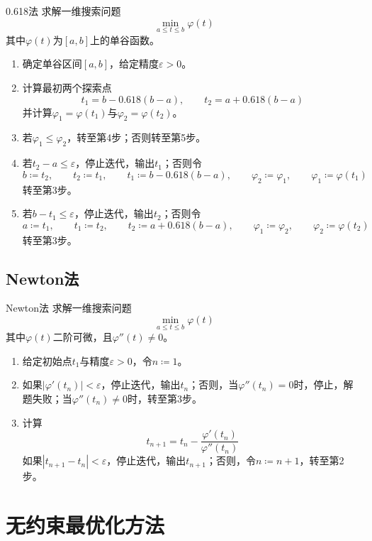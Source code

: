 \documentclass[lang = cn, scheme = chinese, thmcnt = section]{elegantbook}
\begin{document}
\begin{theorem}{0.618法}
	求解一维搜索问题
	$$
	\min_{a\le t \le b}\varphi(t)
	$$
	其中$\varphi(t)$为$[a,b]$上的单谷函数。
	\begin{enumerate}
		\item 确定单谷区间$[a,b]$，给定精度$\varepsilon>0$。
		\item 计算最初两个探索点
		$$
		t_1= b-0.618(b-a),\qquad 
		t_2= a+0.618(b-a)
		$$
		并计算$\varphi_1=\varphi(t_1)$与$\varphi_2=\varphi(t_2)$。
		\item 若$\varphi_1\le\varphi_2$，转至第4步；否则转至第5步。
		\item 若$t_2-a\le\varepsilon$，停止迭代，输出$t_1$；否则令
		$$
		b\coloneqq t_2,\qquad 
		t_2\coloneqq t_1,\qquad 
		t_1\coloneqq b-0.618(b-a),\qquad 
		\varphi_2\coloneqq \varphi_1,\qquad 
		\varphi_1\coloneqq \varphi(t_1)
		$$
		转至第3步。
		\item 若$b-t_1\le\varepsilon$，停止迭代，输出$t_2$；否则令
		$$
		a\coloneqq t_1,\qquad 
		t_1\coloneqq t_2,\qquad 
		t_2\coloneqq a+0.618(b-a),\qquad 
		\varphi_1\coloneqq \varphi_2,\qquad 
		\varphi_2\coloneqq \varphi(t_2)
		$$
		转至第3步。
	\end{enumerate}
\end{theorem}

\subsection{Newton法}

\begin{theorem}{Newton法}
	求解一维搜索问题
	$$
	\min_{a\le t \le b}\varphi(t)
	$$
	其中$\varphi(t)$二阶可微，且$\varphi''(t)\ne 0$。
	\begin{enumerate}
		\item 给定初始点$t_1$与精度$\varepsilon>0$，令$n\coloneqq 1$。
		\item 如果$|\varphi'(t_n)|<\varepsilon$，停止迭代，输出$t_n$；否则，当$\varphi''(t_n)=0$时，停止，解题失败；当$\varphi''(t_n)\ne 0$时，转至第3步。
		\item 计算
		$$
		t_{n+1}=t_n-\frac{\varphi'(t_n)}{\varphi''(t_n)}
		$$
		如果$|t_{n+1}-t_n|<\varepsilon$，停止迭代，输出$t_{n+1}$；否则，令$n\coloneqq n+1$，转至第2步。
	\end{enumerate}
\end{theorem}

\section{无约束最优化方法}
\end{document}
